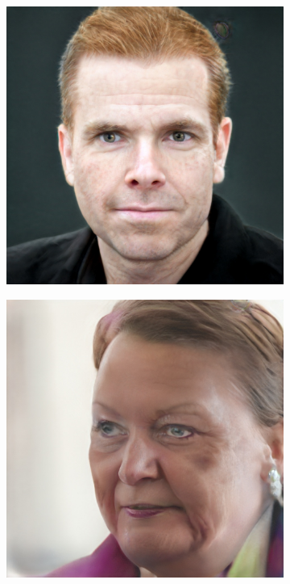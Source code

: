 \begin{figure}[h!]
    \begin{subfigure}[b]{0.24\textwidth}
        \includegraphics[width=\textwidth]{fig/stylegan/faceedit/inger-gender}
    \end{subfigure}
    \begin{subfigure}[b]{0.24\textwidth}
        \includegraphics[width=\textwidth]{fig/stylegan/faceedit/lars-gender}

\end{subfigure}
\end{figure}
